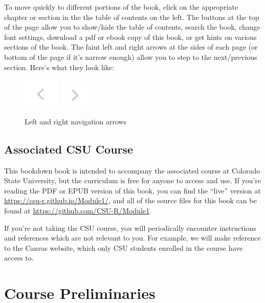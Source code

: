 \documentclass[
]{article}
\begin{document}
To move quickly to different portions of the book, click on the appropriate chapter or section in the the table of contents on the left.
The buttons at the top of the page allow you to show/hide the table of contents, search the book, change font settings, download a pdf or ebook copy of this book, or get hints on various sections of the book.
The faint left and right arrows at the sides of each page (or bottom of the page if it's narrow enough) allow you to step to the next/previous section.
Here's what they look like:

\begin{figure}

{\centering \includegraphics{src/images/left_arrow} \includegraphics{src/images/right_arrow} 

}

\caption{Left and right navigation arrows}\label{fig:unnamed-chunk-1}
\end{figure}

\hypertarget{associated-csu-course}{%
\subsection{Associated CSU Course}\label{associated-csu-course}}

This bookdown book is intended to accompany the associated course at Colorado State University, but the curriculum is free for anyone to access and use.
If you're reading the PDF or EPUB version of this book, you can find the ``live'' version at \url{https://csu-r.github.io/Module1/}, and all of the source files for this book can be found at \url{https://github.com/CSU-R/Module1}.

If you're not taking the CSU course, you will periodically encounter instructions and references which are not relevant to you. For example, we will make reference to the Canvas website, which only CSU students enrolled in the course have access to.

\hypertarget{prelim}{%
\section{Course Preliminaries}\label{prelim}}
\end{document}

